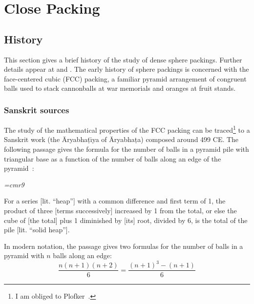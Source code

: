 

\chapter{Close Packing}

\section{History}\label{sec:history}

This section gives a brief history of the study of dense sphere
packings.  Further details appear at \cite{Szpiro} and
\cite{Hales:2006:overview}.
The early history of sphere packings is concerned with the
face-centered cubic (FCC) packing, a familiar pyramid arrangement
of congruent balls used to stack cannonballs at war memorials and
oranges at fruit stands.

\subsection{Sanskrit sources}



The study of the mathematical properties of the FCC
packing can be traced\footnote{I am obliged to Plofker~\cite{Plo00}.} to a Sanskrit work (the \=Aryabha\d t\={\i}ya
 of \=Aryabha\d ta) composed around 499 CE.  The following passage gives
the formula for the number of balls in a pyramid pile with triangular base as
a function of the number of balls along an edge of the pyramid~\cite{Ary}:


\bigskip

{\narrower\it\font\ninerm=cmr9

For a series [lit. ``heap''] with a common difference and
  first term of 1, the product of three [terms successively] increased
  by 1 from the total, or else the cube of [the total] plus 1
  diminished by [its] root, divided by 6, is the total of the pile
  [lit. ``solid heap''].  

}

\bigskip

 In modern notation, the passage gives two formulas for the number of
 balls in a pyramid with $n$ balls along an edge:
\[
\dfrac{n(n+1)(n+2)}{6} =  \dfrac{(n+1)^3 - (n+1)}{6}
\]

